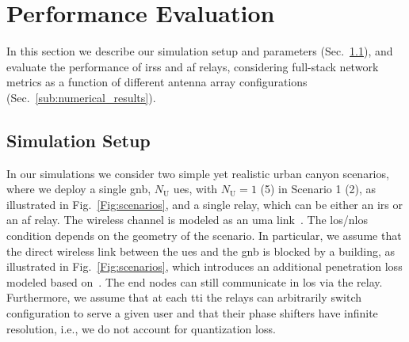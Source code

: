 

\section{Performance Evaluation}
\label{sec:results}

In this section we describe our simulation setup and parameters (Sec.~\ref{sub:simulation_setup}), and evaluate the performance of \glspl{irs} and \gls{af} relays, considering full-stack network metrics as a function of different antenna array configurations (Sec.~\ref{sub:numerical_results}).

\subsection{Simulation Setup} %
\label{sub:simulation_setup}

In our simulations we consider two simple yet realistic urban canyon scenarios, where we deploy a single \gls{gnb}, $N_{\mathrm U}$ \glspl{ue}, with $N_{\mathrm U}=1$ (5) in Scenario 1 (2), as illustrated in Fig.~\ref{Fig:scenarios}, and a single relay, which can be either an \gls{irs} or an \gls{af} relay.
The wireless channel is modeled as an \gls{uma} link~\cite{3gpp.38.901}. %
The \gls{los}/\gls{nlos} condition depends on the geometry of the scenario.
In particular, we assume that the direct wireless link between the \glspl{ue} and the \gls{gnb} is blocked by a building, as illustrated in Fig.~\ref{Fig:scenarios}, which introduces an additional penetration loss modeled based on~\cite[Sec. 7.4.3.1]{3gpp.38.901}.
The end nodes can still communicate in \gls{los} via the relay. 
Furthermore, we assume that at each \gls{tti} the relays can arbitrarily switch configuration to serve a given user and that their phase shifters have infinite resolution, i.e., we do not account for quantization loss.
 

